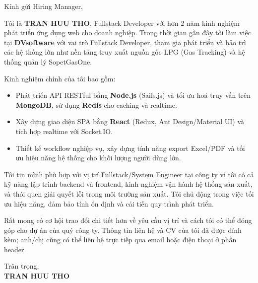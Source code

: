 \documentclass[10pt, letterpaper]{article}
\begin{document}
\pagestyle{empty}



\vspace{0.5cm}

\begin{onecolentry}

Kính gửi Hiring Manager,

\vspace{0.2cm}

Tôi là \textbf{TRAN HUU THO}, Fullstack Developer với hơn 2 năm kinh nghiệm phát triển ứng dụng web cho doanh nghiệp. Trong thời gian gần đây tôi làm việc tại \textbf{DVsoftware} với vai trò Fullstack Developer, tham gia phát triển và bảo trì các hệ thống lớn như nền tảng truy xuất nguồn gốc LPG (Gas Tracking) và hệ thống quản lý SopetGasOne.

\vspace{0.2cm}

Kinh nghiệm chính của tôi bao gồm:
\begin{itemize}
    \item Phát triển API RESTful bằng \textbf{Node.js} (Sails.js) và tối ưu hoá truy vấn trên \textbf{MongoDB}, sử dụng \textbf{Redis} cho caching và realtime.
    \item Xây dựng giao diện SPA bằng \textbf{React} (Redux, Ant Design/Material UI) và tích hợp realtime với Socket.IO.
    \item Thiết kế workflow nghiệp vụ, xây dựng tính năng export Excel/PDF và tối ưu hiệu năng hệ thống cho khối lượng người dùng lớn.
\end{itemize}

\vspace{0.2cm}

Tôi tin mình phù hợp với vị trí Fullstack/System Engineer tại công ty vì tôi có cả kỹ năng lập trình backend và frontend, kinh nghiệm vận hành hệ thống sản xuất, và thói quen giải quyết lỗi trong môi trường sản xuất. Tôi chủ động trong việc tối ưu hiệu năng, đảm bảo tính ổn định và cải tiến quy trình phát triển.

\vspace{0.2cm}

Rất mong có cơ hội trao đổi chi tiết hơn về yêu cầu vị trí và cách tôi có thể đóng góp cho dự án của quý công ty. Thông tin liên hệ và CV của tôi đã được đính kèm; anh/chị cũng có thể liên hệ trực tiếp qua email hoặc điện thoại ở phần header.

\vspace{0.4cm}

Trân trọng,\\
\textbf{TRAN HUU THO}

\end{onecolentry}
\end{document}
